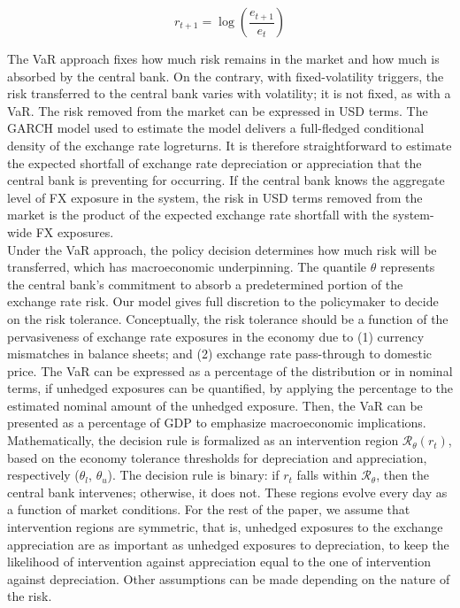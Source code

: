 \documentclass[11pt]{article}
\begin{document}
\begin{equation*}
  r_{t+1} = \log\left(\frac{e_{t+1}}{e_t}\right)
\end{equation*}


The VaR  approach fixes how much  risk remains in  the market and how  much is
absorbed by the central bank. On the contrary, with fixed-volatility triggers,
the risk  transferred to the  central bank varies  with volatility; it  is not
fixed, as with a VaR. The risk removed from the market can be expressed in USD
terms. The  GARCH model  used to  estimate the  model delivers  a full-fledged
conditional  density  of  the  exchange  rate  logreturns.   It  is  therefore
straightforward  to   estimate  the   expected  shortfall  of   exchange  rate
depreciation  or  appreciation  that  the   central  bank  is  preventing  for
occurring. If the central bank knows the aggregate level of FX exposure in the
system, the risk  in USD terms removed  from the market is the  product of the
expected exchange rate shortfall with the system-wide FX exposures.\\


Under the VaR  approach, the policy decision determines how  much risk will be
transferred,  which has  macroeconomic  underpinning.   The quantile  $\theta$
represents the central bank's commitment  to absorb a predetermined portion of
the exchange rate risk. Our model  gives full discretion to the policymaker to
decide on  the risk tolerance.  Conceptually,  the risk tolerance should  be a
function of the pervasiveness of exchange rate exposures in the economy due to
(1) currency mismatches in balance  sheets; and (2) exchange rate pass-through
to  domestic  price.   The  VaR  can  be expressed  as  a  percentage  of  the
distribution or in nominal terms, if  unhedged exposures can be quantified, by
applying  the percentage  to  the  estimated nominal  amount  of the  unhedged
exposure. Then, the VaR  can be presented as a percentage  of GDP to emphasize
macroeconomic implications.\\

Mathematically,  the decision  rule is  formalized as  an intervention  region
$\mathcal{R}_\theta\left(r_t\right)$,   based   on   the   economy   tolerance
thresholds  for  depreciation   and  appreciation,  respectively  ($\theta_l$,
$\theta_u$).    The  decision   rule  is   binary:  if   $r_t$  falls   within
$\mathcal{R}_\theta$,  then the  central bank  intervenes; otherwise,  it does
not. These  regions evolve every day  as a function of  market conditions. For
the rest of the paper, we assume that intervention regions are symmetric, that
is,  unhedged exposures  to  the  exchange appreciation  are  as important  as
unhedged exposures  to depreciation,  to keep  the likelihood  of intervention
against   appreciation   equal   to    the   one   of   intervention   against
depreciation. Other  assumptions can be  made depending  on the nature  of the
risk.
\end{document}
